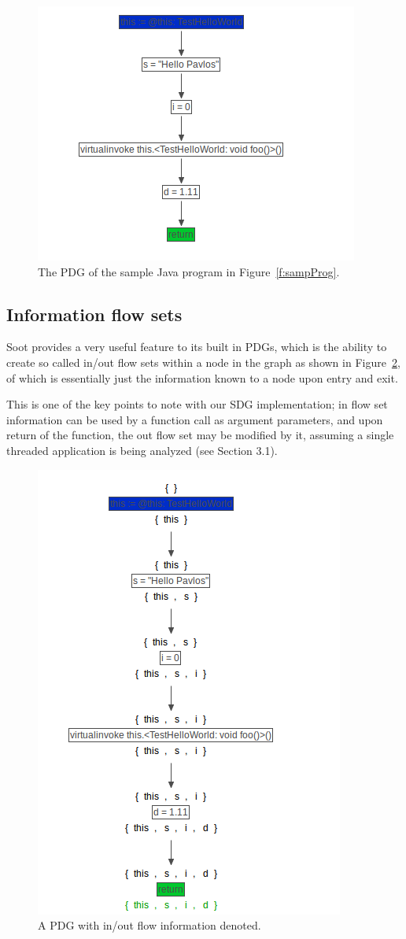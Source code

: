 \documentclass[authoryear,preprint]{sigplanconf}
\begin{document}
\begin{figure}[ht]
	\centering
	\includegraphics[width=.6\linewidth]{figures/Selection_079}
	\caption[The PDG of the sample Java program in Figure~\ref{f:sampProg}]{\label{f:sampPdg}The PDG of the sample Java program in Figure~\ref{f:sampProg}.}
\end{figure}

\subsection{Information flow sets}

Soot provides a very useful feature to its built in PDGs, which is the ability to create so called in/out flow sets within a node in the graph as shown in Figure~\ref{f:sampInOut}, of which is essentially just the information known to a node upon entry and exit.

This is one of the key points to note with our SDG implementation; in flow set information can be used by a function call as argument parameters, and upon return of the function, the out flow set may be modified by it, assuming a single threaded application is being analyzed (see Section 3.1).

\begin{figure}[ht]
	\centering
	\includegraphics[width=.6\linewidth]{figures/Selection_080}
	\caption[A PDG with in/out flow information denoted.]{\label{f:sampInOut}A PDG with in/out flow information denoted.}
\end{figure}
\end{document}
